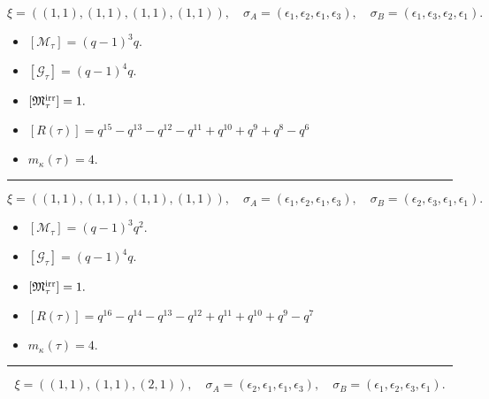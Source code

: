 \documentclass[10pt,a4paper]{amsart}
\begin{document}
$$\xi = ({(1, 1)}, {(1, 1)}, {(1, 1), (1, 1)}),\quad \sigma_A = ({{\epsilon_1}}, {{\epsilon_2}}, {{\epsilon_1}, {\epsilon_3}}),\quad \sigma_B = ({{\epsilon_1}}, {{\epsilon_3}}, {{\epsilon_2}, {\epsilon_1}}).$$

\begin{itemize}
 \item $[\mathcal{M}_{\tau}] = {\left(q - 1\right)}^{3} q .$

 \item $[\mathcal{G}_{\tau}] = {\left(q - 1\right)}^{4} q .$

 \item $[{\frak M}_{\tau}^{\textrm{irr}}] = 1 .$

 \item $[R(\tau)] = q^{15} - q^{13} - q^{12} - q^{11} + q^{10} + q^{9} + q^{8} - q^{6} $

 \item $m_{\kappa}(\tau) = 4 .$

 \end{itemize}
\noindent\rule{8cm}{0.4pt}

$$\xi = ({(1, 1)}, {(1, 1)}, {(1, 1), (1, 1)}),\quad \sigma_A = ({{\epsilon_1}}, {{\epsilon_2}}, {{\epsilon_1}, {\epsilon_3}}),\quad \sigma_B = ({{\epsilon_2}}, {{\epsilon_3}}, {{\epsilon_1}, {\epsilon_1}}).$$

\begin{itemize}
 \item $[\mathcal{M}_{\tau}] = {\left(q - 1\right)}^{3} q^{2} .$

 \item $[\mathcal{G}_{\tau}] = {\left(q - 1\right)}^{4} q .$

 \item $[{\frak M}_{\tau}^{\textrm{irr}}] = 1 .$

 \item $[R(\tau)] = q^{16} - q^{14} - q^{13} - q^{12} + q^{11} + q^{10} + q^{9} - q^{7} $

 \item $m_{\kappa}(\tau) = 4 .$

 \end{itemize}
\noindent\rule{8cm}{0.4pt}

$$\xi = ({(1, 1)}, {(1, 1)}, {(2, 1)}),\quad \sigma_A = ({{\epsilon_2}}, {{\epsilon_1}}, {{\epsilon_1, \epsilon_3}}),\quad \sigma_B = ({{\epsilon_1}}, {{\epsilon_2}}, {{\epsilon_3, \epsilon_1}}).$$
\end{document}
